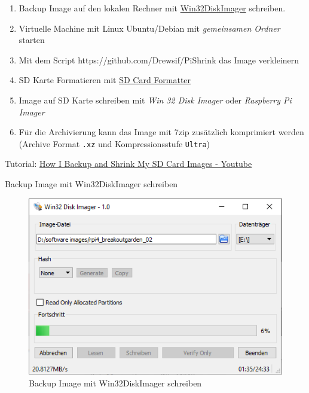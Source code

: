 \documentclass[
  11pt,
  a4paper,
  oneside, openany  ,captions=tableheading
]{scrbook}
\providecommand{\tightlist}{%
  \setlength{\itemsep}{0pt}\setlength{\parskip}{0pt}}
\theoremstyle{remark}
\begin{document}
\begin{enumerate}
\def\labelenumi{\arabic{enumi}.}
\tightlist
\item
  Backup Image auf den lokalen Rechner mit
  \href{https://sourceforge.net/projects/win32diskimager/}{Win32DiskImager}
  schreiben.
\item
  Virtuelle Machine mit Linux Ubuntu/Debian mit \emph{gemeinsamen
  Ordner} starten
\item
  Mit dem Script https://github.com/Drewsif/PiShrink das Image
  verkleinern
\item
  SD Karte Formatieren mit
  \href{https://www.sdcard.org/downloads/formatter}{SD Card Formatter}
\item
  Image auf SD Karte schreiben mit \emph{Win 32 Disk Imager} oder
  \emph{Raspberry Pi Imager}
\item
  Für die Archivierung kann das Image mit 7zip zusätzlich komprimiert
  werden (Archive Format \texttt{.xz} und Kompressionsstufe
  \texttt{Ultra})
\end{enumerate}

Tutorial: \href{https://www.youtube.com/watch?v=5pdgO3Ncl6k}{How I
Backup and Shrink My SD Card Images - Youtube}

Backup Image mit Win32DiskImager schreiben

\begin{figure}[H]

{\centering \includegraphics{images/raspberrypi_image_verkleinern_01.png}

}

\caption{Backup Image mit Win32DiskImager schreiben}

\end{figure}%
\end{document}
